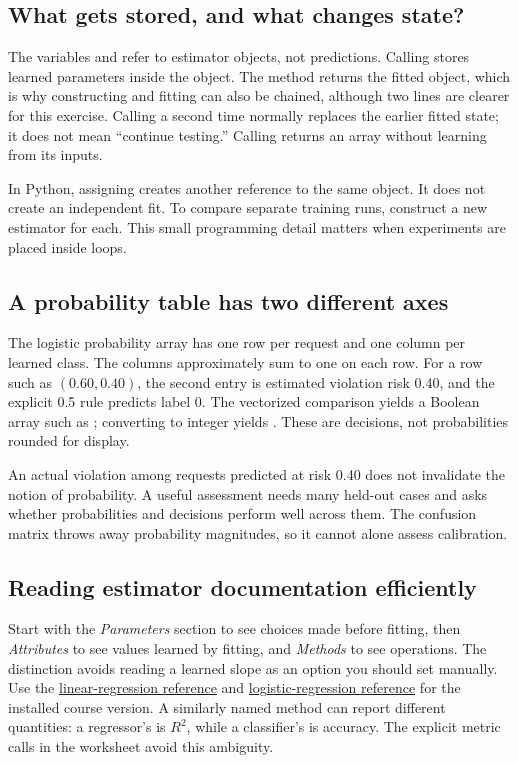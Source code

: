 \subsection*{What gets stored, and what changes state?}
The variables  and  refer to estimator objects, not predictions.
Calling  stores learned parameters inside the object. The method returns the fitted object, which is
why constructing and fitting can also be chained, although two lines are clearer for this exercise.
Calling  a second time normally replaces the earlier fitted state; it does not mean ``continue testing.''
Calling  returns an array without learning from its inputs.

In Python, assigning  creates another reference to the same object.
It does not create an independent fit. To compare separate training runs, construct a new estimator for each.
This small programming detail matters when experiments are placed inside loops.

\subsection*{A probability table has two different axes}
The logistic probability array has one row per request and one column per learned class.
The columns approximately sum to one on each row. For a row such as $(0.60,0.40)$, the second entry is
estimated violation risk 0.40, and the explicit 0.5 rule predicts label 0.
The vectorized comparison yields a Boolean array such as ; converting to integer
yields \code{[0, 1, 0]}. These are decisions, not probabilities rounded for display.

An actual violation among requests predicted at risk 0.40 does not invalidate the notion of probability.
A useful assessment needs many held-out cases and asks whether probabilities and decisions perform well
across them. The confusion matrix throws away probability magnitudes, so it cannot alone assess calibration.

\subsection*{Reading estimator documentation efficiently}
Start with the \emph{Parameters} section to see choices made before fitting, then \emph{Attributes} to see values
learned by fitting, and \emph{Methods} to see operations. The distinction avoids reading a learned slope as an option
you should set manually.
Use the \href{https://scikit-learn.org/1.8/modules/generated/sklearn.linear_model.LinearRegression.html}{linear-regression reference}
and \href{https://scikit-learn.org/1.8/modules/generated/sklearn.linear_model.LogisticRegression.html}{logistic-regression reference}
for the installed course version. A similarly named method can report different quantities: a regressor's
 is $R^2$, while a classifier's is accuracy. The explicit metric calls in the worksheet avoid this ambiguity.

